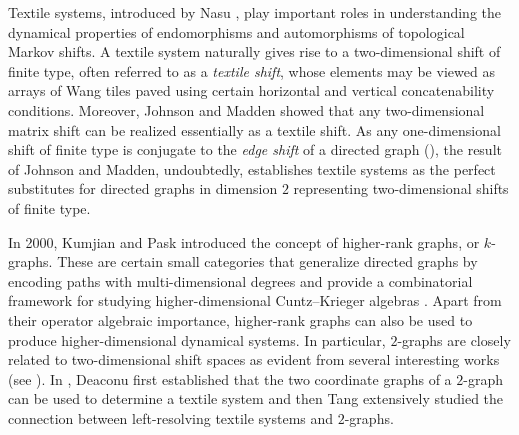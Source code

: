\documentclass[a4paper,reqno,12pt]{amsart}
\theoremstyle{definition}
\theoremstyle{remark}
\begin{document}
Textile systems, introduced by Nasu \cite{Nasu}, play important roles in understanding the dynamical properties of endomorphisms and automorphisms of topological Markov shifts. A textile system naturally gives rise to a two-dimensional shift of finite type, often referred to as a \emph{textile shift}, whose elements may be viewed as arrays of Wang tiles paved using certain horizontal and vertical concatenability conditions. Moreover, Johnson and Madden \cite{JM} showed that any two-dimensional matrix shift can be realized essentially as a textile shift. As any one-dimensional shift of finite type is conjugate to the \emph{edge shift} of a directed graph (\cite[Theorem 2.3.2]{Lind-Marcus}), the result of Johnson and Madden, undoubtedly, establishes textile systems as the perfect substitutes for directed graphs in dimension $2$ representing two-dimensional shifts of finite type.  

In 2000, Kumjian and Pask \cite{Kumjian-Pask} introduced the concept of higher-rank graphs, or $k$-graphs. These are certain small categories that generalize directed graphs by encoding paths with multi-dimensional degrees and provide a combinatorial framework for studying higher-dimensional Cuntz--Krieger algebras \cite{Robertson}. Apart from their operator algebraic importance, higher-rank graphs can also be used to produce higher-dimensional dynamical systems. In particular, $2$-graphs are closely related to two-dimensional shift spaces as evident from several interesting works (see \cite{BGGLPP,Deaconu, KPW, PRW,SZ,Tang}). In \cite[Proposition 3.7]{Deaconu}, Deaconu first established that the two coordinate graphs of a $2$-graph can be used to determine a textile system and then Tang \cite{Tang} extensively studied the connection between left-resolving textile systems and $2$-graphs.  
\end{document}
